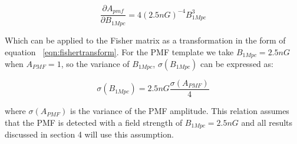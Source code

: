 \begin{equation}
\label{eqn:diffapmf}
\frac{\partial A_{pmf}}{\partial B_{1Mpc}} = 4(2.5nG)^{-4}B_{1Mpc}^3
\end{equation}
 
Which can be applied to the Fisher matrix as a transformation in the form of equation ~\ref{eqn:fishertransform}.
For the PMF template we take $B_{1Mpc} = 2.5nG$ when $A_{PMF} = 1$, so
the variance of $B_{1Mpc}$, $\sigma(B_{1Mpc})$ can be expressed as:

\begin{equation}
\label{eqn:sigmab1mpc}
\sigma(B_{1Mpc}) = 2.5nG\frac{\sigma(A_{PMF})}{4}
\end{equation}

where $\sigma(A_{PMF})$ is the variance of the PMF amplitude. This relation assumes that the PMF is detected with a field strength of $B_{1Mpc} = 2.5nG$ and all results discussed in section 4 will use this assumption.
